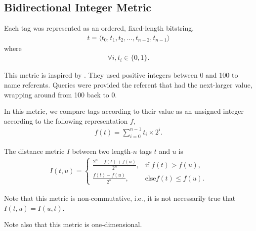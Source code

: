 \subsection{Bidirectional Integer Metric} \label{sec:integerbimetric}

Each tag was represented as an ordered, fixed-length bitstring,
\begin{align*}
t = \langle t_0, t_1, t_2, \dots, t_{n-2}, t_{n-1} \rangle
\end{align*}
where
\begin{align*}
\forall i, t_i \in \{0, 1\}.
\end{align*}

This metric is inspired by \citep{spector2011tag}.
They used positive integers between 0 and 100 to name referents.
Queries were provided the referent that had the next-larger value, wrapping around from 100 back to 0.

In this metric, we compare tags according to their value as an unsigned integer according to the following representation $f$,
\begin{align*}
f(t)
= \sum_{i=0}^{n-1} t_i \times 2^i.
\end{align*}

The distance metric $I$ between two length-$n$ tags $t$ and $u$ is
\begin{align*}
I(t, u) =
\begin{cases}
  \frac{2^n - f(t) + f(u)}{2^n}, & \text{if } f(t) > f(u), \\
  \frac{f(t) - f(u)}{2^n},         & \text{else} f(t) \leq f(u).
\end{cases}
\end{align*}

Note that this metric is non-commutative, i.e., it is not necessarily true that $I(t, u) = I(u, t)$.

Note also that this metric is one-dimensional.


